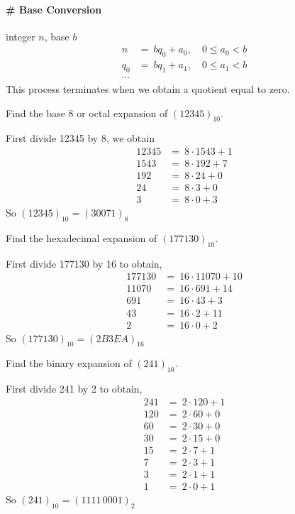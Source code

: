 \documentclass[../main-sheet.tex]{subfiles}
\begin{document}
\paragraph{\# Base Conversion} integer $ n $, base $ b $
\begin{align*}
    n      & =\ bq_0+a_0,\quad 0\leq a_0<b \\
    q_0    & =\ bq_1+a_1,\quad 0\leq a_1<b \\
    \cdots &                               
\end{align*}
This process terminates when we obtain a quotient equal to zero.
\begin{prob}
    Find the base 8 or octal expansion of \((12345)_{10}\).
\end{prob}
\begin{soln}
    First divide 12345 by 8, we obtain
    \begin{align*}
        12345 & =\ 8\cdot1543+1 \\
        1543  & =\ 8\cdot 192+7 \\
        192   & =\ 8\cdot24+0   \\
        24    & =\ 8\cdot3+0    \\
        3     & =\ 8\cdot0+3
    \end{align*}
    So \((12345)_{10}=(30071)_8\)
\end{soln}
\begin{prob}
    Find the hexadecimal expansion of \((177130)_{10}\).
\end{prob}
\begin{soln}
    First divide 177130 by 16 to obtain,
    \begin{align*}
        177130 & =\ 16\cdot11070+10 \\
        11070  & =\ 16\cdot691+14   \\
        691    & =\ 16\cdot43+3     \\
        43     & =\ 16\cdot2+11     \\
        2      & =\ 16\cdot0+2
    \end{align*}
    So \((177130)_{10}=(2B3EA)_{16}\)
\end{soln}
\newpage
\begin{prob}
    Find the binary expansion of \((241)_{10}\).
\end{prob}
\begin{soln}
    First divide 241 by 2 to obtain,
    \begin{align*}
        241 & =\ 2\cdot120+1 \\
        120 & =\ 2\cdot60+0  \\
        60  & =\ 2\cdot30+0  \\
        30  & =\ 2\cdot15+0  \\
        15  & =\ 2\cdot7+1   \\
        7   & =\ 2\cdot3+1   \\
        3   & =\ 2\cdot1+1   \\
        1   & =\ 2\cdot0+1
    \end{align*}
    So \((241)_{10}=(1111\,0001)_{2}\)
\end{soln}
\end{document}
